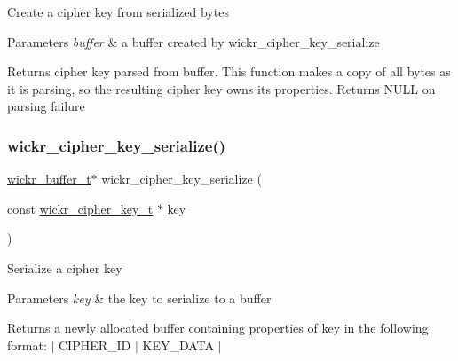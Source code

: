 Create a cipher key from serialized bytes


\begin{DoxyParams}{Parameters}
{\em buffer} & a buffer created by \textquotesingle{}wickr\+\_\+cipher\+\_\+key\+\_\+serialize\textquotesingle{} \\
\hline
\end{DoxyParams}
\begin{DoxyReturn}{Returns}
cipher key parsed from \textquotesingle{}buffer\textquotesingle{}. This function makes a copy of all bytes as it is parsing, so the resulting cipher key owns its properties. Returns N\+U\+LL on parsing failure 
\end{DoxyReturn}
\mbox{\label{group__wickr__cipher_ga8716aebf03497c379d5ff81fe32cde32}} 
\subsubsection{\texorpdfstring{wickr\_cipher\_key\_serialize()}{wickr\_cipher\_key\_serialize()}}
{\footnotesize\ttfamily \mbox{\hyperlink{structwickr__buffer}{wickr\+\_\+buffer\+\_\+t}}$\ast$ wickr\+\_\+cipher\+\_\+key\+\_\+serialize (\begin{DoxyParamCaption}\item[{const \mbox{\hyperlink{structwickr__cipher__key}{wickr\+\_\+cipher\+\_\+key\+\_\+t}} $\ast$}]{key }\end{DoxyParamCaption})}

Serialize a cipher key


\begin{DoxyParams}{Parameters}
{\em key} & the key to serialize to a buffer \\
\hline
\end{DoxyParams}
\begin{DoxyReturn}{Returns}
a newly allocated buffer containing properties of \textquotesingle{}key\textquotesingle{} in the following format\+: $\vert$ C\+I\+P\+H\+E\+R\+\_\+\+ID $\vert$ K\+E\+Y\+\_\+\+D\+A\+TA $\vert$ 
\end{DoxyReturn}
\mbox{\label{group__wickr__cipher_gace82050fcc8b7932df9a9e8109a2fc1d}} 
